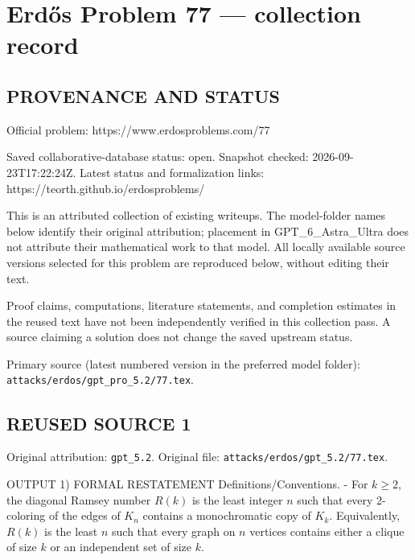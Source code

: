 \section*{Erd\H{o}s Problem 77 --- collection record}

\subsection*{PROVENANCE AND STATUS}
Official problem: https://www.erdosproblems.com/77

Saved collaborative-database status: open.
Snapshot checked: 2026-09-23T17:22:24Z.
Latest status and formalization links: https://teorth.github.io/erdosproblems/

This is an attributed collection of existing writeups. The model-folder names below identify their original attribution; placement in GPT\_6\_Astra\_Ultra does not attribute their mathematical work to that model. All locally available source versions selected for this problem are reproduced below, without editing their text.

Proof claims, computations, literature statements, and completion estimates in the reused text have not been independently verified in this collection pass. A source claiming a solution does not change the saved upstream status.

Primary source (latest numbered version in the preferred model folder): \texttt{attacks/erdos/gpt\_pro\_5.2/77.tex}.

\subsection*{REUSED SOURCE 1}
Original attribution: \texttt{gpt\_5.2}.
Original file: \texttt{attacks/erdos/gpt\_5.2/77.tex}.


OUTPUT
1) FORMAL RESTATEMENT
Definitions/Conventions.
- For $k\ge 2$, the diagonal Ramsey number $R(k)$ is the least integer $n$ such that every 2-coloring of the edges of $K_n$
  contains a monochromatic copy of $K_k$.
Equivalently, $R(k)$ is the least $n$ such that every graph on $n$ vertices contains either a clique of size $k$ or an independent set of size $k$.

